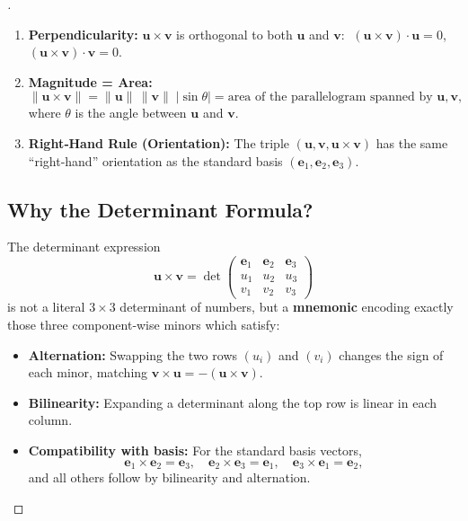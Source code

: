 \documentclass[11pt,openany]{article}
\renewcommand{\emph}[1]{\textbf{#1}}
\begin{document}
\begin{proof}[\sol]
\begin{enumerate}
	\item \textbf{Perpendicularity:}
	\(\mathbf u\times\mathbf v\) is orthogonal to both \(\mathbf u\) and \(\mathbf v\):
	\(\;(\mathbf u\times\mathbf v)\cdot\mathbf u=0\),
	\((\mathbf u\times\mathbf v)\cdot\mathbf v=0.\)
	
	\item \textbf{Magnitude = Area:}
	\[
	\|\mathbf u\times\mathbf v\|
	= \|\mathbf u\|\,\|\mathbf v\|\;\bigl|\sin\theta\bigr|
	= \text{area of the parallelogram spanned by \(\mathbf u,\mathbf v\)},
	\]
	where \(\theta\) is the angle between \(\mathbf u\) and \(\mathbf v\).
	
	\item \textbf{Right‐Hand Rule (Orientation):}
	The triple \((\mathbf u,\mathbf v,\mathbf u\times\mathbf v)\) has the same “right‐hand” orientation as the standard basis \((\mathbf e_1,\mathbf e_2,\mathbf e_3)\).
\end{enumerate}

\subsection*{Why the Determinant Formula?}

The determinant expression
\[
\mathbf u\times\mathbf v
=\det
\begin{pmatrix}
	\mathbf e_1 & \mathbf e_2 & \mathbf e_3\\
	u_1         & u_2         & u_3         \\
	v_1         & v_2         & v_3
\end{pmatrix}
\]
is not a literal \(3\times3\) determinant of numbers, but a \emph{mnemonic} encoding exactly those three component‐wise minors which satisfy:

\begin{itemize}
	\item \emph{Alternation:} Swapping the two rows \((u_i)\) and \((v_i)\) changes the sign of each minor, matching \(\mathbf v\times\mathbf u=-(\mathbf u\times\mathbf v)\).
	\item \emph{Bilinearity:} Expanding a determinant along the top row is linear in each column.
	\item \emph{Compatibility with basis:} For the standard basis vectors,
	\[
	\mathbf e_1\times\mathbf e_2 = \mathbf e_3,\quad
	\mathbf e_2\times\mathbf e_3 = \mathbf e_1,\quad
	\mathbf e_3\times\mathbf e_1 = \mathbf e_2,
	\]
	and all others follow by bilinearity and alternation.
\end{itemize}


\end{proof}
\end{document}
